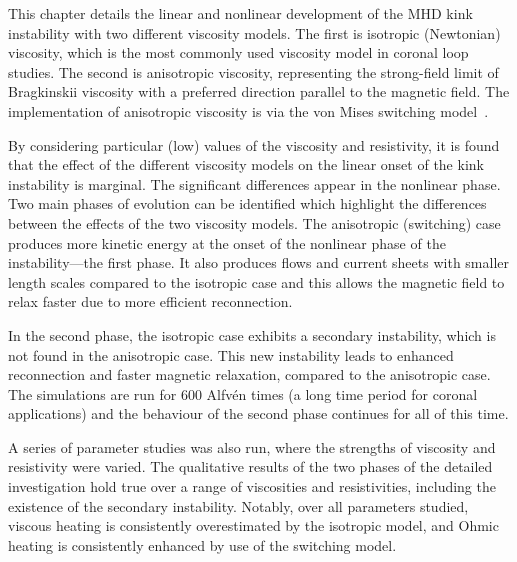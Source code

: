 \label{sec:conclusions}

This chapter details the linear and nonlinear development of the MHD kink
instability with two different viscosity models. The first is
isotropic (Newtonian) viscosity, which is the most commonly used
viscosity model in coronal loop studies. The second is anisotropic viscosity, representing the strong-field limit of Bragkinskii viscosity with a preferred direction parallel to the magnetic field. The implementation of anisotropic viscosity is via the von Mises switching model~\cite{mactaggartBraginskiiMagnetohydrodynamicsArbitrary2017}.

By considering particular (low) values of the viscosity and resistivity, it is found that the effect of the different viscosity models on the linear onset of the kink instability is marginal. The significant differences appear in the nonlinear phase. Two main phases of evolution can be identified which highlight the differences between the effects of the two viscosity models. The anisotropic (switching) case produces more kinetic energy at the onset of the nonlinear phase of the instability---the first phase. It also produces flows and current sheets with smaller length scales compared to the isotropic case and this allows the magnetic field to relax faster due to more efficient reconnection. 

In the second phase, the isotropic case exhibits a secondary instability, which is not found in the anisotropic case. This new instability leads to enhanced reconnection and faster magnetic relaxation, compared to the anisotropic case.  The simulations are run for $600$ Alfv\'en times (a long time period for coronal applications) and the behaviour of the second phase continues for all of this time.

A series of parameter studies was also run, where the strengths of viscosity and resistivity were varied. The qualitative results of the two phases of the detailed investigation hold true over a range of viscosities and resistivities, including the existence of the secondary instability. Notably, over all parameters studied, viscous heating is consistently overestimated by the isotropic model, and Ohmic heating is consistently enhanced by use of the switching model.
